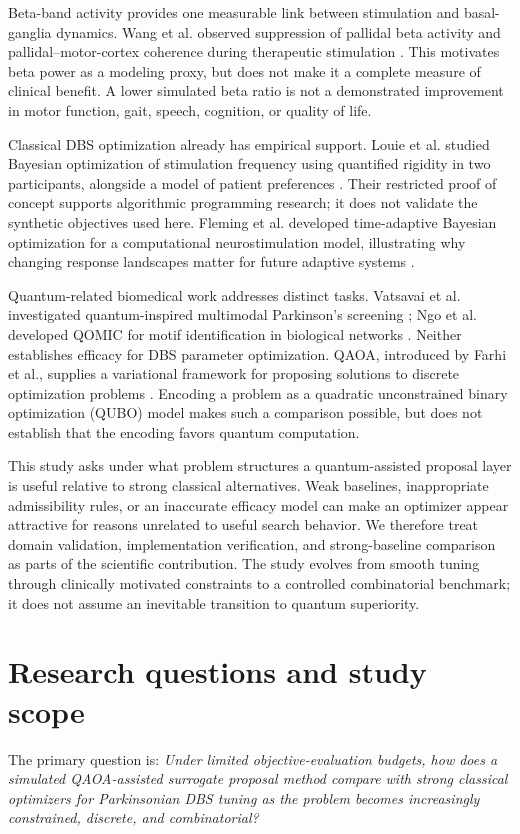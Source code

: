 \documentclass[11pt,letterpaper]{article}
\begin{document}
Beta-band activity provides one measurable link between stimulation and basal-ganglia dynamics. Wang et al. observed suppression of pallidal beta activity and pallidal--motor-cortex coherence during therapeutic stimulation \cite{wang}. This motivates beta power as a modeling proxy, but does not make it a complete measure of clinical benefit. A lower simulated beta ratio is not a demonstrated improvement in motor function, gait, speech, cognition, or quality of life.

Classical DBS optimization already has empirical support. Louie et al. studied Bayesian optimization of stimulation frequency using quantified rigidity in two participants, alongside a model of patient preferences \cite{louie}. Their restricted proof of concept supports algorithmic programming research; it does not validate the synthetic objectives used here. Fleming et al. developed time-adaptive Bayesian optimization for a computational neurostimulation model, illustrating why changing response landscapes matter for future adaptive systems \cite{fleming}.

Quantum-related biomedical work addresses distinct tasks. Vatsavai et al. investigated quantum-inspired multimodal Parkinson's screening \cite{vatsavai}; Ngo et al. developed QOMIC for motif identification in biological networks \cite{ngo}. Neither establishes efficacy for DBS parameter optimization. QAOA, introduced by Farhi et al., supplies a variational framework for proposing solutions to discrete optimization problems \cite{farhi}. Encoding a problem as a quadratic unconstrained binary optimization (QUBO) model makes such a comparison possible, but does not establish that the encoding favors quantum computation.

This study asks under what problem structures a quantum-assisted proposal layer is useful relative to strong classical alternatives. Weak baselines, inappropriate admissibility rules, or an inaccurate efficacy model can make an optimizer appear attractive for reasons unrelated to useful search behavior. We therefore treat domain validation, implementation verification, and strong-baseline comparison as parts of the scientific contribution. The study evolves from smooth tuning through clinically motivated constraints to a controlled combinatorial benchmark; it does not assume an inevitable transition to quantum superiority.

\section{Research questions and study scope}
The primary question is: \emph{Under limited objective-evaluation budgets, how does a simulated QAOA-assisted surrogate proposal method compare with strong classical optimizers for Parkinsonian DBS tuning as the problem becomes increasingly constrained, discrete, and combinatorial?}
\end{document}
